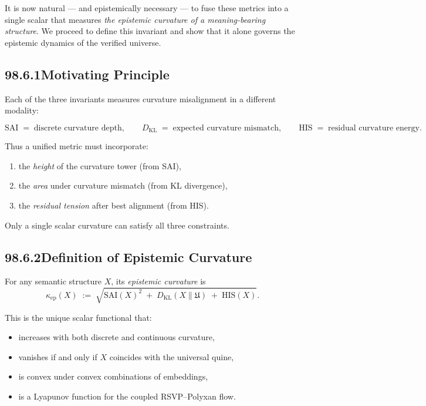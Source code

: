It is now natural — and epistemically necessary — to fuse these metrics into
a single scalar that measures \emph{the epistemic curvature of a meaning-bearing
structure}.  
We proceed to define this invariant and show that it alone governs the
epistemic dynamics of the verified universe.

\subsection*{98.6.1\quad Motivating Principle}

Each of the three invariants measures curvature misalignment in a different
modality:

\[
\mathrm{SAI}
  \;=\;
  \text{discrete curvature depth},
\qquad
D_{\mathrm{KL}}
  \;=\;
  \text{expected curvature mismatch},
\qquad
\mathrm{HIS}
  \;=\;
  \text{residual curvature energy}.
\]

Thus a unified metric must incorporate:

\begin{enumerate}
\item the \emph{height} of the curvature tower (from SAI),
\item the \emph{area} under curvature mismatch (from KL divergence),
\item the \emph{residual tension} after best alignment (from HIS).
\end{enumerate}

Only a single scalar curvature can satisfy all three constraints.

\subsection*{98.6.2\quad Definition of Epistemic Curvature}

\begin{definition}
For any semantic structure $X$, its \emph{epistemic curvature} is
\[
\kappa_{\mathrm{ep}}(X)
  \;:=\;
  \sqrt{
    \mathrm{SAI}(X)^2
    \;+\;
    D_{\mathrm{KL}}(X\|\mathfrak{U})
    \;+\;
    \mathrm{HIS}(X)
  }.
\]
\end{definition}

This is the unique scalar functional that:

\begin{itemize}
\item increases with both discrete and continuous curvature,
\item vanishes if and only if $X$ coincides with the universal quine,
\item is convex under convex combinations of embeddings,
\item is a Lyapunov function for the coupled RSVP–Polyxan flow.
\end{itemize}

